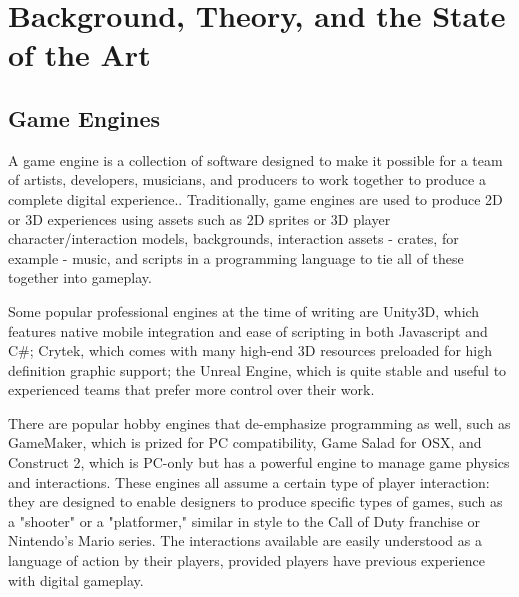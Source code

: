 \chapter{Background, Theory, and the State of the Art}\thispagestyle{empty} %

\label{Chapter2} %


\section{Game Engines}
A game engine is a collection of software designed to make it possible for a team of artists, developers, musicians, and producers to work together to produce a complete digital experience.. Traditionally, game engines are used to produce 2D or 3D experiences using assets such as 2D sprites or 3D player character/interaction models, backgrounds, interaction assets - crates, for example - music, and scripts in a programming language to tie all of these together into gameplay. 

Some popular professional engines at the time of writing are Unity3D, which features native mobile integration and ease of scripting in both Javascript and C\#; Crytek, which comes with many high-end 3D resources preloaded for high definition graphic support; the Unreal Engine, which is quite stable and useful to experienced teams that prefer more control over their work.

There are popular hobby engines that de-emphasize programming as well, such as GameMaker, which is prized for PC compatibility, Game Salad for OSX, and Construct 2, which is PC-only but has a powerful engine to manage game physics and interactions. These engines all assume a certain type of player interaction: they are designed to enable designers to produce specific types of games, such as a "shooter" or a "platformer," similar in style to the Call of Duty franchise or Nintendo's Mario series. The interactions available are easily understood as a language of action by their players, provided players have previous experience with digital gameplay.


